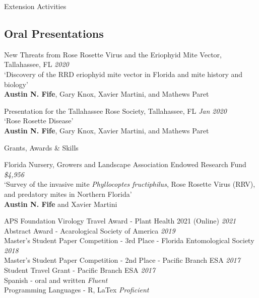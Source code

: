 \documentclass{resume} %
\begin{document}
\begin{rSection}{Extension Activities}
	\subsection*{Oral Presentations}
	New Threats from Rose Rosette Virus and the Eriophyid Mite Vector, Tallahassee, FL \hfill {\em \textit{2020}}\\
	`Discovery of the RRD eriophyid mite vector in Florida and mite history and biology'\\
	\textbf{Austin N. Fife}, Gary Knox, Xavier Martini, and Mathews Paret\\ \hfill
	
	Presentation for the Tallahassee Rose Society, Tallahassee, FL \hfill {\em \textit{Jan 2020}}\\
	`Rose Rosette Disease'\\
	\textbf{Austin N. Fife}, Gary Knox, Xavier Martini, and Mathews Paret\\ \hfill
	
\end{rSection}


\begin{rSection}{Grants, Awards \& Skills}

Florida Nursery, Growers and Landscape Association Endowed Research Fund \hfill {\em \textit{\$4,956}}\\
`Survey of the invasive mite \textit{Phyllocoptes fructiphilus}, Rose Rosette Virus (RRV),\\
 and predatory mites in Northern Florida'\\
\textbf{Austin N. Fife} and Xavier Martini

APS Foundation Virology Travel Award - Plant Health 2021 (Online) \hfill {\em \textit{2021}}\\
Abstract Award - Acarological Society of America \hfill {\em \textit{2019}}\\
Master's Student Paper Competition - 3rd Place - Florida Entomological Society \hfill {\em \textit{2018}}\\
Master's Student Paper Competition - 2nd Place - Pacific Branch ESA \hfill {\em \textit{2017}}\\
Student Travel Grant - Pacific Branch ESA \hfill {\em \textit{2017}}\\
Spanish - oral and written \hfill {\em \textit{Fluent}}\\
Programming Languages - R, LaTex \hfill {\em \textit{Proficient}}\\

\end{rSection}
\end{document}
